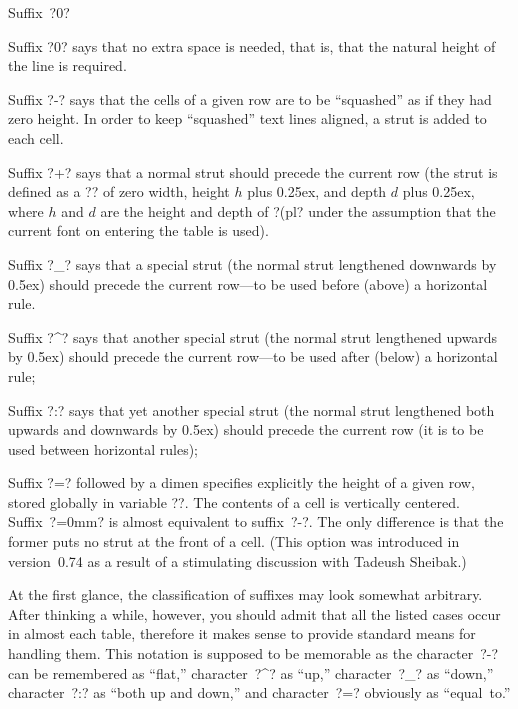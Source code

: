 {
\hbox{Suffix ?0?\enspace}\advance\parindent{}

 \item{Suffix ?0?} says that no extra space is needed, that is, that the
natural height of the line is required.

 \item{Suffix ?-?} says that the cells of a given row are to be ``squashed''
as if they had zero height. In order to keep ``squashed'' text lines
aligned, a strut is added to each cell.

 \item{Suffix ?+?} says that a normal strut should precede the current row
(the strut is defined as a ?\vrule? of zero width, height $h$ plus 0.25ex,
and depth $d$ plus 0.25ex, where $h$ and $d$ are the height and depth of
?\hbox{(pl}? under the assumption that the current font on entering the table
is used).

 \item{Suffix ?_?} says that a special strut (the normal strut lengthened
downwards by 0.5ex) should precede the current row---to be used before
(above) a horizontal rule.

 \item{Suffix ?^?} says that another special strut (the normal strut
lengthened upwards by 0.5ex) should precede the current row---to be used
after (below) a horizontal rule;

 \item{Suffix ?:?} says that yet another special strut (the normal strut
lengthened both upwards and downwards by 0.5ex) should precede the current
row (it is to be used between horizontal rules);

 \item{Suffix ?=?} followed by a dimen specifies explicitly the height of a
given row, stored globally in variable ?\tablerowheight?. The contents of a
cell is vertically centered. Suffix~?=0mm? is almost equivalent to
suffix~?-?. The only difference is that the former puts no strut at the front
of a cell. (This option was introduced in version~0.74 as a result of a
stimulating discussion with Tadeush Sheibak.)

}

\medskip

At the first glance, the classification of suffixes may look somewhat
arbitrary.  After thinking a while, however, you should admit that all the
listed cases occur in almost each table, therefore it makes sense to provide
standard means for handling them. This notation is supposed to be memorable
as the character~?-?  can be remembered as ``flat,'' character~?^? as ``up,''
character~?_? as ``down,'' character~?:? as ``both up and down,''
and character~?=? obviously as ``equal~to.''

